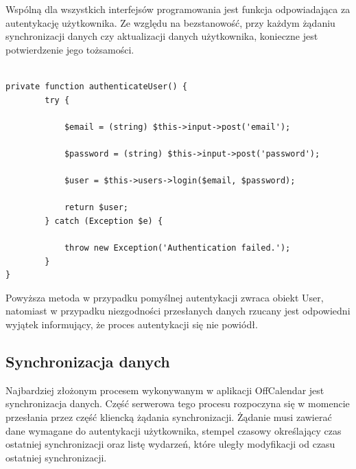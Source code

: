 Wspólną dla wszystkich interfejsów programowania jest funkcja odpowiadająca za autentykację użytkownika. Ze względu na bezstanowość, przy każdym żądaniu synchronizacji danych czy aktualizacji danych użytkownika, konieczne jest potwierdzenie jego tożsamości.

\begin{lstlisting}[caption=Rejestracja użytkowników przy użyciu metody register interfejsu Users\_api., label=amb, captionpos=b]

private function authenticateUser() {
    	try {

        	$email = (string) $this->input->post('email');

        	$password = (string) $this->input->post('password');

        	$user = $this->users->login($email, $password);

        	return $user;
    	} catch (Exception $e) {

        	throw new Exception('Authentication failed.');
    	}
}

\end{lstlisting}

Powyższa metoda w przypadku pomyślnej autentykacji zwraca obiekt User, natomiast w przypadku niezgodności przesłanych danych rzucany jest odpowiedni wyjątek informujący, że proces autentykacji się nie powiódł.

\subsection{Synchronizacja danych}
\label{serwSynDanych}

Najbardziej złożonym procesem wykonywanym w aplikacji OffCalendar jest synchronizacja danych. Część serwerowa tego procesu rozpoczyna się w momencie przesłania przez część kliencką żądania synchronizacji. Żądanie musi zawierać dane wymagane do autentykacji użytkownika, stempel czasowy określający czas ostatniej synchronizacji oraz listę wydarzeń, które uległy modyfikacji od czasu ostatniej synchronizacji.

